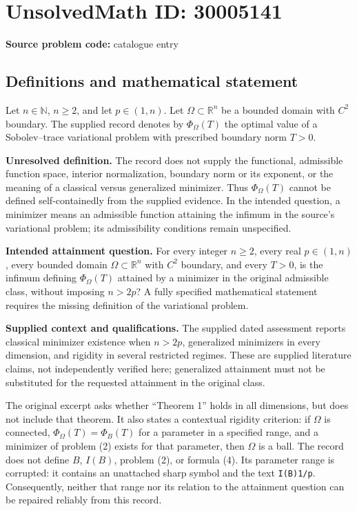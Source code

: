 \documentclass[11pt]{article}
\newcommand{\N}{\mathbb{N}}
\newcommand{\R}{\mathbb{R}}
\begin{document}
\section*{UnsolvedMath ID: 30005141}
\textbf{Source problem code:} catalogue entry
\subsection{Definitions and mathematical statement}
Let \(n\in\N\), \(n\geq 2\), and let \(p\in(1,n)\). Let \(\Omega\subset\R^n\) be a bounded domain with \(C^2\) boundary. The supplied record denotes by \(\Phi_\Omega(T)\) the optimal value of a Sobolev--trace variational problem with prescribed boundary norm \(T>0\).

\textbf{Unresolved definition.} The record does not supply the functional, admissible function space, interior normalization, boundary norm or its exponent, or the meaning of a classical versus generalized minimizer. Thus \(\Phi_\Omega(T)\) cannot be defined self-containedly from the supplied evidence. In the intended question, a minimizer means an admissible function attaining the infimum in the source's variational problem; its admissibility conditions remain unspecified.

\textbf{Intended attainment question.} For every integer \(n\geq2\), every real \(p\in(1,n)\), every bounded domain \(\Omega\subset\R^n\) with \(C^2\) boundary, and every \(T>0\), is the infimum defining \(\Phi_\Omega(T)\) attained by a minimizer in the original admissible class, without imposing \(n>2p\)? A fully specified mathematical statement requires the missing definition of the variational problem.

\textbf{Supplied context and qualifications.} The supplied dated assessment reports classical minimizer existence when \(n>2p\), generalized minimizers in every dimension, and rigidity in several restricted regimes. These are supplied literature claims, not independently verified here; generalized attainment must not be substituted for the requested attainment in the original class.

The original excerpt asks whether ``Theorem 1'' holds in all dimensions, but does not include that theorem. It also states a contextual rigidity criterion: if \(\Omega\) is connected, \(\Phi_\Omega(T)=\Phi_B(T)\) for a parameter in a specified range, and a minimizer of problem (2) exists for that parameter, then \(\Omega\) is a ball. The record does not define \(B\), \(I(B)\), problem (2), or formula (4). Its parameter range is corrupted: it contains an unattached sharp symbol and the text \texttt{I(B)1/p}. Consequently, neither that range nor its relation to the attainment question can be repaired reliably from this record.
\end{document}
